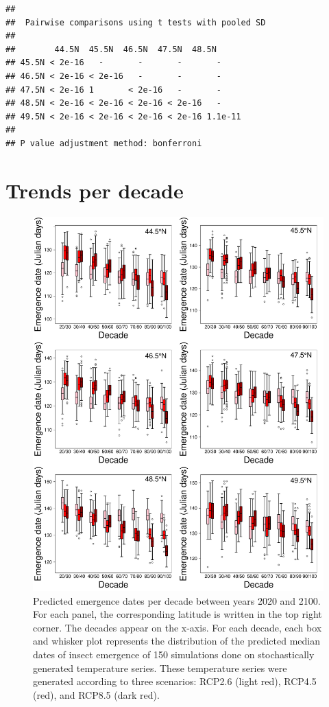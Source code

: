 \documentclass[12 pt]{article}
\begin{document}
\begin{verbatim}
## 
##  Pairwise comparisons using t tests with pooled SD 
## 
##        44.5N  45.5N  46.5N  47.5N  48.5N  
## 45.5N < 2e-16   -       -       -       -      
## 46.5N < 2e-16 < 2e-16   -       -       -      
## 47.5N < 2e-16 1       < 2e-16   -       -      
## 48.5N < 2e-16 < 2e-16 < 2e-16 < 2e-16   -      
## 49.5N < 2e-16 < 2e-16 < 2e-16 < 2e-16 1.1e-11
## 
## P value adjustment method: bonferroni
\end{verbatim}

\section{Trends per decade}
\begin{figure}[ht]
\begin{center}
\renewcommand{\thefigure}{S\arabic{figure}}
\includegraphics[width = 14 cm, keepaspectratio]{Emergence_Per_Decade}
\caption{\doublespacing Predicted emergence dates per decade between years 2020 and 2100. For each panel, the corresponding latitude is written in the top right corner. The decades appear on the x-axis. For each decade, each box and whisker plot represents the distribution of the predicted median dates of insect emergence of 150 simulations done on stochastically generated temperature series. These temperature series were generated according to three scenarios: RCP2.6 (light red), RCP4.5 (red), and RCP8.5 (dark red).}
\end{center}
\end{figure}
\end{document}
